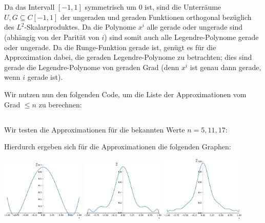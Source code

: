\section{}

Da das Intervall $[-1,1]$ symmetrisch um $0$ ist, sind die Unterräume $U, G \subseteq C[-1, 1]$ der ungeraden und geraden Funktionen orthogonal bezüglich des $L^2$-Skalarproduktes.
Da die Polynome $x^i$ alle gerade oder ungerade sind (abhängig von der Parität von $i$) sind somit auch alle Legendre-Polynome gerade oder ungerade.
Da die Runge-Funktion gerade ist, genügt es für die Approximation dabei, die geraden Legendre-Polynome zu betrachten;
dies sind gerade die Legendre-Polynome von geraden Grad (denn $x^i$ ist genau dann gerade, wenn $i$ gerade ist).

Wir nutzen nun den folgenden Code, um die Liste der Approximationen vom Grad $\leq n$ zu berechnen:





\subsection{}

Wir testen die Approximationen für die bekannten Werte $n = 5, 11, 17$:



Hierdurch ergeben sich für die Approximationen die folgenden Graphen:

\begin{center}
  \includegraphics[width = 0.3\textwidth]{chapter_09/exercise_09_49_figure_1.pdf}
  \hspace{1em}
  \includegraphics[width = 0.3\textwidth]{chapter_09/exercise_09_49_figure_2.pdf}
  \hspace{1em}
  \includegraphics[width = 0.3\textwidth]{chapter_09/exercise_09_49_figure_3.pdf}
\end{center}



